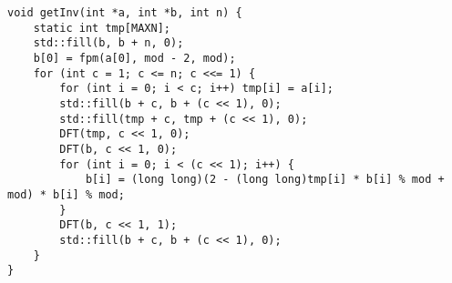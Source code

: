 \begin{lstlisting}
void getInv(int *a, int *b, int n) {
	static int tmp[MAXN];
	std::fill(b, b + n, 0);
	b[0] = fpm(a[0], mod - 2, mod);
	for (int c = 1; c <= n; c <<= 1) {
		for (int i = 0; i < c; i++) tmp[i] = a[i];
		std::fill(b + c, b + (c << 1), 0);
		std::fill(tmp + c, tmp + (c << 1), 0);
		DFT(tmp, c << 1, 0);
		DFT(b, c << 1, 0);
		for (int i = 0; i < (c << 1); i++) {
			b[i] = (long long)(2 - (long long)tmp[i] * b[i] % mod + mod) * b[i] % mod;
		}
		DFT(b, c << 1, 1);
		std::fill(b + c, b + (c << 1), 0);
	}
}
\end{lstlisting}
